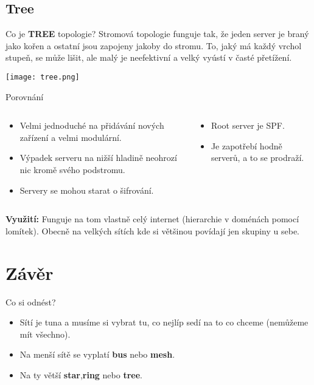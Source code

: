 \documentclass{beamer}
\begin{document}
\subsection{Tree}
\label{sec:tree}

\begin{frame}{Co je \textbf{TREE} topologie?}
    Stromová topologie funguje tak, že jeden server je braný jako kořen a
    ostatní jsou zapojeny jakoby do stromu. To, jaký má každý vrchol stupeň, se
    může lišit, ale malý je neefektivní a velký vyústí v časté přetížení.

    \texttt{[image: tree.png]}
\end{frame}

\begin{frame}{Porovnání}

\begin{columns}
    \begin{column}{0.45\textwidth}
        \begin{itemize}
         \item Velmi jednoduché na přidávání nových zařízení a velmi modulární.
         \item Výpadek serveru na nižší hladině neohrozí nic kromě svého
             podstromu.
         \item Servery se mohou starat o šifrování.

        \end{itemize}
    \end{column}
    \begin{column}{0.45\textwidth}  %
        \begin{itemize}
            \item Root server je SPF.
            \item Je zapotřebí hodně serverů, a to se prodraží.
        \end{itemize}
    \end{column}
    \end{columns}
    \vspace{10pt}

\textbf{Využití:} Funguje na tom vlastně celý internet (hierarchie v doménách
pomocí lomítek). Obecně na velkých sítích kde si většinou povídají jen skupiny u
sebe.

\end{frame}

\section{Závěr}
\label{sec:zaver}

\begin{frame}{Co si odnést?}
 \begin{itemize}
  \item Sítí je tuna a musíme si vybrat tu, co nejlíp sedí na to co chceme
      (nemůžeme mít všechno).
  \item Na menší sítě se vyplatí \textbf{bus} nebo \textbf{mesh}.
  \item Na ty větší \textbf{star},\textbf{ring} nebo \textbf{tree}.
 \end{itemize}
 
\end{frame}
\end{document}
